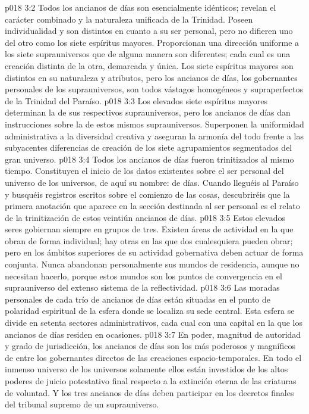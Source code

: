 \vs p018 3:2 Todos los ancianos de días son esencialmente idénticos; revelan el carácter combinado y la naturaleza unificada de la Trinidad. Poseen individualidad y son distintos en cuanto a su ser personal, pero no difieren uno del otro como los siete espíritus mayores. Proporcionan una dirección uniforme a los siete suprauniversos que de alguna manera son diferentes; cada cual es una creación distinta de la otra, demarcada y única. Los siete espíritus mayores son distintos en su naturaleza y atributos, pero los ancianos de días, los gobernantes personales de los suprauniversos, son todos vástagos homogéneos y supraperfectos de la Trinidad del Paraíso.
\vs p018 3:3 Los elevados siete espíritus mayores determinan la  de sus respectivos suprauniversos, pero los ancianos de días dan instrucciones sobre la  de estos mismos suprauniversos. Superponen la uniformidad administrativa a la diversidad creativa y aseguran la armonía del todo frente a las subyacentes diferencias de creación de los siete agrupamientos segmentados del gran universo.
\vs p018 3:4 \pc Todos los ancianos de días fueron trinitizados al mismo tiempo. Constituyen el inicio de los datos existentes sobre el ser personal del universo de los universos, de aquí su nombre:  de días. Cuando lleguéis al Paraíso y busquéis registros escritos sobre el comienzo de las cosas, descubriréis que la primera anotación que aparece en la sección destinada al ser personal es el relato de la trinitización de estos veintiún ancianos de días.
\vs p018 3:5 \pc Estos elevados seres gobiernan siempre en grupos de tres. Existen áreas de actividad en la que obran de forma individual; hay otras en las que dos cualesquiera pueden obrar; pero en los ámbitos superiores de su actividad gobernativa deben actuar de forma conjunta. Nunca abandonan personalmente sus mundos de residencia, aunque no necesitan hacerlo, porque estos mundos son los puntos de convergencia en el suprauniverso del extenso sistema de la reflectividad.
\vs p018 3:6 Las moradas personales de cada trío de ancianos de días están situadas en el punto de polaridad espiritual de la esfera donde se localiza su sede central. Esta esfera se divide en setenta sectores administrativos, cada cual con una capital en la que los ancianos de días residen en ocasiones.
\vs p018 3:7 En poder, magnitud de autoridad y grado de jurisdicción, los ancianos de días son los más poderosos y magníficos de entre los gobernantes directos de las creaciones espacio\hyp{}temporales. En todo el inmenso universo de los universos solamente ellos están investidos de los altos poderes de juicio potestativo final respecto a la extinción eterna de las criaturas de voluntad. Y los tres ancianos de días deben participar en los decretos finales del tribunal supremo de un suprauniverso.
